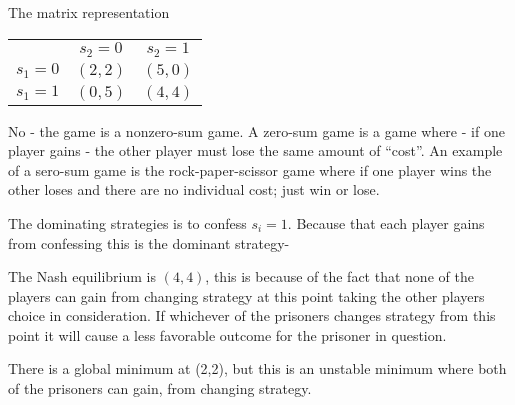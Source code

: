 The matrix representation
  \begin{center}
    \begin{tabular}{ r|c|c| }
      \multicolumn{1}{r}{}
      & \multicolumn{1}{c}{$s_2 = 0$}
      & \multicolumn{1}{c}{$s_2 = 1$}                                   \\
      \cline{2-3}
      $s_1 = 0$ & $(2,2)$ & $(5,0)$                                               \\
      \cline{2-3}
      $s_1 = 1$ & $(0,5)$ & $(4,4)$                                               \\
      \cline{2-3}
    \end{tabular}
  \end{center}

 No - the game is a nonzero-sum game. A zero-sum game is a game where - if one
player gains - the other player must lose the same amount of ``cost''. An example of a sero-sum game is the
rock-paper-scissor game where if one player wins the other loses and there are no individual cost; just win or lose.

 The dominating strategies is to confess $s_i = 1$. Because that each
player gains from confessing this is the dominant strategy-

 The Nash equilibrium is $(4,4)$, this is because of the fact that none of the
players can gain from changing strategy at this point taking the other players choice in consideration. If whichever of
the prisoners changes strategy from this point it will cause a less favorable outcome for the prisoner in question.

  There is a global minimum at (2,2), but this is an unstable minimum where both of the prisoners can gain, from
changing strategy.
